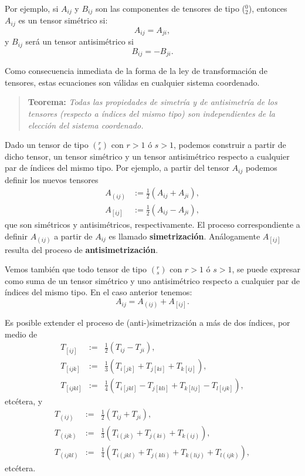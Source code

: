 Por ejemplo, si $A_{ij}$ y $B_{ij}$ son las componentes de tensores de tipo
($_2^0$), entonces $A_{ij}$ es un tensor simétrico si:
\begin{equation}
A_{ij}=A_{ji}, \label{sim1}
\end{equation}
y $B_{ij}$ será un tensor antisimétrico si
\begin{equation}
B_{ij}=-B_{ji}. \label{sim2}
\end{equation}

Como consecuencia inmediata de la forma de la ley de transformación de
tensores, estas ecuaciones son válidas en cualquier sistema coordenado.

\begin{quotation}
\textbf{Teorema:} \textit{Todas las propiedades de simetría y de
antisimetría de los tensores (respecto a índices del mismo tipo) son independientes de la elección del sistema coordenado.}
\end{quotation}

Dado un tensor de tipo $(^r_s)$ con $r>1$ ó $s>1$, podemos construir
a partir de dicho tensor, un tensor simétrico y un tensor
antisimétrico respecto a cualquier par de índices del mismo tipo. Por ejemplo, a partir del tensor $A_{ij}$ podemos definir los nuevos tensores
\begin{align}
A_{(ij)} & :=\frac{1}2\left( A_{ij}+A_{ji}\right) ,\label{sim3}\\
A_{[ij]} & :=\frac{1}2\left( A_{ij}-A_{ji}\right) ,\nonumber
\end{align}
que son simétricos y antisimétricos, respectivamente. El proceso
correspondiente a definir $A_{(ij)}$ a partir de $A_{ij}$ es llamado \textbf{simetrización}. Análogamente $A_{[ij]}$ resulta del proceso de \textbf{antisimetrización}.

Vemos también que todo tensor de tipo $(^r_s)$ con $r>1$ ó $s>1$, se
puede expresar como suma de un tensor simétrico y uno antisimétrico respecto a
cualquier par de índices del mismo tipo. En el caso anterior
tenemos:
\begin{equation}
A_{ij}=A_{(ij)}+A_{[ij]}.\label{sim4}
\end{equation}

Es posible extender el proceso de (anti-)simetrización a más de dos índices, por
medio de
\begin{eqnarray}
T_{[ij]}&:=&\frac{1}2(T_{ij}-T_{ji}), \\
T_{[ijk]}&:=&\frac{1}{3}(T_{i[jk]}+T_{j[ki]}+T_{k[ij]}), \label{as3}\\
T_{[ijkl]}&:=&\frac{1}{4}(T_{i[jkl]}-T_{j[kli]}+T_{k[lij]}-T_{l[ijk]}),
\end{eqnarray}
etcétera, y
\begin{eqnarray}
T_{(ij)}&:=&\frac{1}2(T_{ij}+T_{ji}), \\
T_{(ijk)}&:=&\frac{1}{3}(T_{i(jk)}+T_{j(ki)}+T_{k(ij)}), \\
T_{(ijkl)}&:=&\frac{1}{4}(T_{i(jkl)}+T_{j(kli)}+T_{k(lij)}+T_{l(ijk)}),
\end{eqnarray}
etcétera.

